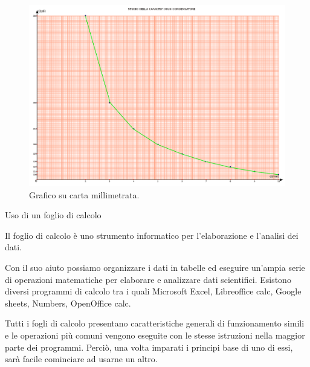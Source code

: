 \documentclass[12pt,a4paper,oneside]{book}
\makeatletter
\renewcommand{\section}{\@startsection{section}{1}{\z@}
{-4ex \@plus -1ex \@minus -.4ex}
{1ex \@plus.2ex }
{\normalfont\large\sffamily\bfseries}}
\theoremstyle{esercizio}
\makeatother
\begin{document}
    \begin{figure}[h!]
    \centering
    \includegraphics[width=\linewidth]{img/graficomanuale.pdf} 
    \caption{Grafico su carta millimetrata.}
    \label{fig:graficomanuale}
\end{figure} 


 










\section{Uso di un foglio di calcolo}

\begin{definizione}
    Il foglio di calcolo è uno strumento informatico per l'elaborazione e l'analisi  dei dati.
\end{definizione}

Con il suo aiuto possiamo organizzare  i dati in tabelle ed eseguire un'ampia serie di operazioni matematiche per elaborare e analizzare dati scientifici. Esistono diversi programmi di calcolo tra i quali Microsoft Excel, Libreoffice calc, Google sheets, Numbers, OpenOffice calc. 

\begin{remark}
Tutti i fogli di calcolo presentano caratteristiche generali di funzionamento simili e le operazioni più comuni vengono eseguite con le stesse istruzioni nella maggior parte dei programmi. Perciò, una volta imparati i principi base di uno di essi, sarà facile cominciare ad usarne un altro. 
    \end{remark}
\end{document}
